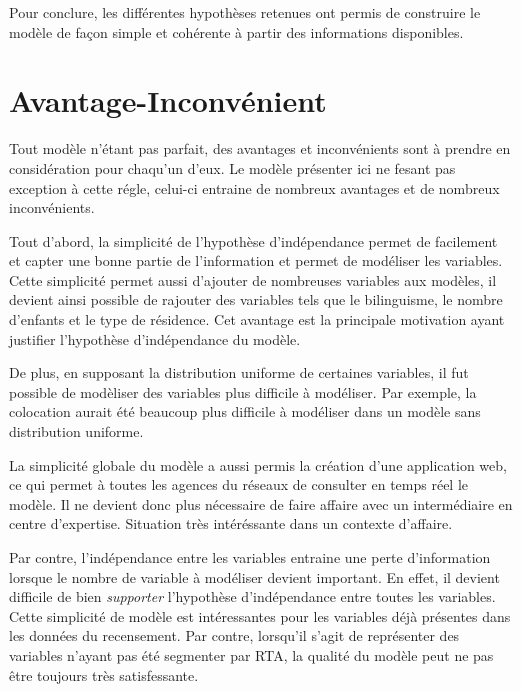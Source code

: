 \documentclass[11pt,french]{report}\usepackage[]{graphicx}\usepackage[]{color}
\begin{document}
Pour conclure, les différentes hypothèses retenues ont permis de construire le modèle de façon simple et cohérente à partir des informations disponibles.

\section*{Avantage-Inconvénient}
Tout modèle n'étant pas parfait, des avantages et inconvénients sont à prendre en considération pour chaqu'un d'eux. Le modèle présenter ici ne fesant pas exception à cette régle, celui-ci entraine de nombreux avantages et de nombreux inconvénients. 
\newline

Tout d'abord, la simplicité de l'hypothèse d'indépendance permet de facilement et capter une bonne partie de l'information et permet de modéliser les variables. Cette simplicité permet aussi d'ajouter de nombreuses variables aux modèles, il devient ainsi possible de rajouter des variables tels que le bilinguisme, le nombre d'enfants et le type de résidence. Cet avantage est la principale motivation ayant justifier l'hypothèse d'indépendance du modèle.
\newline

De plus, en supposant la distribution uniforme de certaines variables, il fut possible de modèliser des variables plus difficile à modéliser. Par exemple, la colocation aurait été beaucoup plus difficile à modéliser dans un modèle sans distribution uniforme. 
\newline

La simplicité globale du modèle a aussi permis la création d'une application web, ce qui permet à toutes les agences du réseaux de consulter en temps réel le modèle. Il ne devient donc plus nécessaire de faire affaire avec un intermédiaire en centre d'expertise. Situation très intéréssante dans un contexte d'affaire.
\newline

Par contre, l'indépendance entre les variables entraine une perte d'information lorsque le nombre de variable à modéliser devient important. En effet, il devient difficile de bien \emph{supporter} l'hypothèse d'indépendance entre toutes les variables. Cette simplicité de modèle est intéressantes pour les variables déjà présentes dans les données du recensement. Par contre, lorsqu'il s'agit de représenter des variables n'ayant pas été segmenter par RTA, la qualité du modèle peut ne pas être toujours très satisfessante.
\newline
\end{document}
